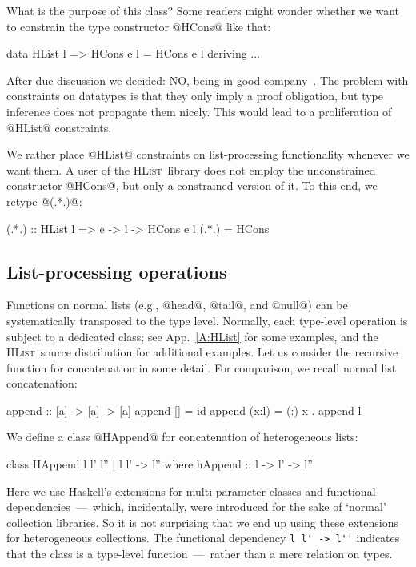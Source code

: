 \documentclass[nocopyrightspace,preprint]{sigplan-proc}
\newcommand{\hwVsTr}[2]{#2}
\newcommand{\HList}{\textsc{HList}}
\begin{document}
What is the purpose of this class? Some readers might wonder whether
we want to constrain the type constructor @HCons@ like that:

\begin{code}
 data HList l => HCons e l = HCons e l deriving ...
\end{code}

After due discussion we decided: NO, being in good
company~\cite{SPJ04}. The problem with constraints on datatypes is
that they only imply a proof obligation, but type inference does not
propagate them nicely. This would lead to a proliferation of @HList@
constraints.

We rather place @HList@ constraints on list-processing functionality
whenever we want them. A user of the \HList\ library does not employ
the unconstrained constructor @HCons@, but only a constrained version
of it. To this end, we retype @(.*.)@:

\begin{code}
 (.*.) :: HList l => e -> l -> HCons e l
 (.*.) =  HCons
\end{code}


\medskip

\subsection*{List-processing operations}

Functions on normal lists (e.g., @head@, @tail@, and @null@) can be
systematically transposed to the type level. Normally, each type-level
operation is subject to a dedicated class; \hwVsTr{see~\cite{HList}
for many examples.}{see App.~\ref{A:HList} for some examples, and the
\HList\ source distribution for additional examples.} Let us consider
the recursive function for concatenation in some detail. For
comparison, we recall normal list concatenation:

\begin{code}
 append :: [a] -> [a] -> [a]
 append [] = id
 append (x:l) = (:) x . append l
\end{code}

We define a class @HAppend@ for concatenation of heterogeneous lists:

\begin{code}
 class HAppend l l' l'' | l l' -> l''
  where hAppend :: l -> l' -> l''
\end{code}

Here we use Haskell's extensions for multi-parameter classes and
functional dependencies~---~which, incidentally, were introduced for
the sake of `normal' collection libraries. So it is not surprising
that we end up using these extensions for heterogeneous
collections. The functional dependency \verb!l l' -> l''!  indicates
that the class is a type-level function~---~rather than a mere
relation on types.
\end{document}
